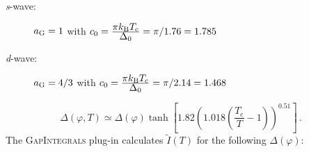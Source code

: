 \documentclass[twoside]{article}
\newcommand{\gapint}{\textsc{GapIntegrals}\xspace}
\begin{document}
\begin{description}
 \item [\textit{s}-wave:] $a_{\rm G}=1$ \qquad with $c_0 =  \frac{\displaystyle\pi k_{\rm B} T_{\rm c}}{\displaystyle\Delta_0} = \pi/1.76 = 1.785$
 \item [\textit{d}-wave:] $a_{\rm G}=4/3$ \quad with $c_0 = \frac{\displaystyle\pi k_{\rm B} T_{\rm c}}{\displaystyle\Delta_0} = \pi/2.14 = 1.468$
\end{description}

\begin{equation}\label{eq:gapT_Manzano}
\Delta(\varphi,T) \simeq \Delta(\varphi)\tanh\left[1.82\left(1.018\left(\frac{T_{\mathrm c}}{T}-1\right)\right)^{0.51}\right]\,.
\end{equation}
The \gapint plug-in calculates $\tilde{I}(T)$ for the following $\Delta(\varphi)$:
\end{document}
